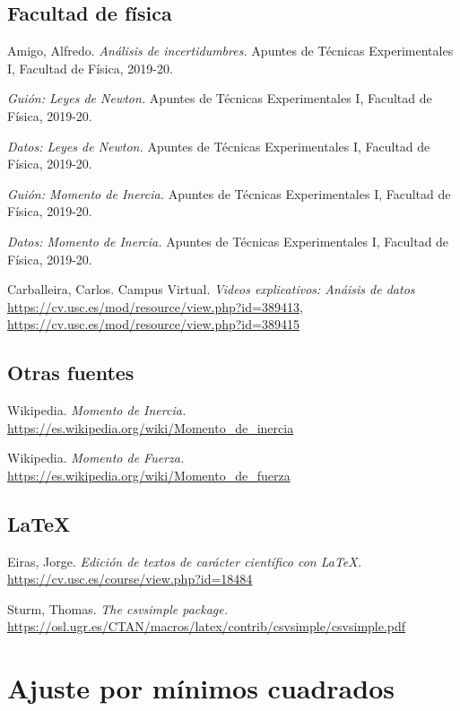 \documentclass[12pt, a4paper, titlepage]{article}
\begin{document}
  \subsection*{Facultad de física}

  Amigo, Alfredo. \textit{Análisis de incertidumbres.} Apuntes de Técnicas Experimentales I, Facultad de Física, 2019-20.

  \textit{Guión: Leyes de Newton.} Apuntes de Técnicas Experimentales I, Facultad de Física, 2019-20.

  \textit{Datos: Leyes de Newton.} Apuntes de Técnicas Experimentales I, Facultad de Física, 2019-20.

  \textit{Guión: Momento de Inercia.} Apuntes de Técnicas Experimentales I, Facultad de Física, 2019-20.

  \textit{Datos: Momento de Inercia.} Apuntes de Técnicas Experimentales I, Facultad de Física, 2019-20.

  Carballeira, Carlos. Campus Virtual. \textit{Videos explicativos: Anáisis de datos} \url{https://cv.usc.es/mod/resource/view.php?id=389413}, \url{https://cv.usc.es/mod/resource/view.php?id=389415}

  \subsection*{Otras fuentes}

  Wikipedia. \textit{Momento de Inercia.} \url{https://es.wikipedia.org/wiki/Momento_de_inercia}

  Wikipedia. \textit{Momento de Fuerza.} \url{https://es.wikipedia.org/wiki/Momento_de_fuerza}

  \subsection*{LaTeX}

  Eiras, Jorge. \textit{Edición de textos de carácter científico con LaTeX.} \url{https://cv.usc.es/course/view.php?id=18484}

  Sturm, Thomas. \textit{The csvsimple package.} \url{https://osl.ugr.es/CTAN/macros/latex/contrib/csvsimple/csvsimple.pdf}

  \section*{Ajuste por mínimos cuadrados}
  \label{s:minimoscuadrados}
\end{document}

